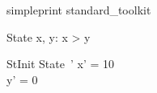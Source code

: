 \documentclass{article}
\begin{document}
\begin{zsection}
\SECTION simpleprint \parents 
			 standard\_toolkit 
\end{zsection}

\begin{schema}{State}
   x, y: \nat
\where
   x > y
\end{schema}

\begin{schema}{StInit}
   State~'
\where
   x' = 10 \\
   y' = 0
\end{schema}

\end{document}
